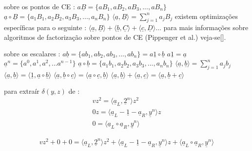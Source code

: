 \begin{appendices}
sobre os pontos de CE : \newline
$a\underline{B} = \{a B_1, a B_2, a B_3, ...,a B_n\}$\newline
$\underline{a}\circ\underline{B} = \{a_1 B_1, a_2 B_2, a_3 B_3, ...,a_n B_n\}$\newline
$\langle\underline{a}, \underline{B}\rangle = \sum_{j=1}^{n} a_j B_j$\newline
existem optimizações específicas para o seguinte : \newline
$\langle\underline{a}, \underline{B}\rangle + \langle\underline{b}, \underline{C}\rangle + \langle\underline{c}, \underline{D}\rangle . . . $\newline
para mais informações sobre algoritmos de factorização sobre pontos de CE (Pippenger et al.) veja-se[].

sobre os escalares : \newline
$a\underline{b} = \{a b_1, a b_2, a b_3, ...,a b_n\} = a\underline{1}\circ \underline{b}$\newline
$a\underline{1} = \underline{a}$\newline
$\underline{a}^n = \{a^0, a^1, a^2, ...a^{n-1}\}$\newline
$\underline{a}\circ\underline{b} = \{a_1 b_1, a_2 b_2, a_3 b_3, ...,a_n b_n\}$\newline
$\langle\underline{a}, \underline{b}\rangle = \sum_{j=1}^{n} a_j b_j$\newline
$\langle\underline{a}, \underline{b}\rangle = \langle \underline{1}, \underline{a}\circ\underline{b}\rangle$\newline
$\langle\underline{a}, \underline{b}\circ\underline{c}\rangle = \langle\underline{a}\circ\underline{c}, \underline{b}\rangle$\newline
$\langle\underline{a}, \underline{b}\rangle + \langle \underline{a}, \underline{c}\rangle = \langle \underline{a}, \underline{b} + \underline{c}\rangle$\newline

para extraír $\delta(y, z)$ de :
\begin{align*}
vz^2 = \langle\underline{a}_L, \underline{2}^n\rangle z^2\\
0z = \langle\underline{a}_L - \underline{1} - \underline{a}_R, \underline{y}^n\rangle z\\
0 = \langle\underline{a}_L \circ \underline{a}_R, \underline{y}^n\rangle
\end{align*}

\begin{align*}
vz^2 + 0 + 0 = \langle\underline{a}_L, \underline{2}^n\rangle z^2 + \langle\underline{a}_L - \underline{1} - \underline{a}_R, \underline{y}^n\rangle z + \langle\underline{a}_L \circ \underline{a}_R, \underline{y}^n\rangle
\end{align*}


\end{appendices}

